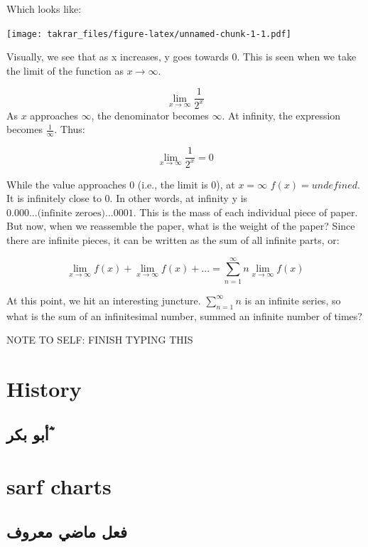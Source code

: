 \documentclass[]{book}
\begin{document}
Which looks like:

\texttt{[image: takrar\_files/figure-latex/unnamed-chunk-1-1.pdf]}

Visually, we see that as x increases, y goes towards 0. This is seen when we take the limit of the function as \(x\to\infty\).

\[
\lim_{x\to\infty} \frac{1}{2^x}
\]
As \(x\) approaches \(\infty\), the denominator becomes \(\infty\). At infinity, the expression becomes \(\frac{1}{\infty}\). Thus:

\[
\lim_{x\to\infty} \frac{1}{2^x} = 0
\label{eq:2}
\]

While the value approaches 0 (i.e., the limit is 0), at \(x=\infty\) \(f(x)=undefined\). It is infinitely close to 0. In other words, at infinity y is \(0.000 ...\text{(infinite zeroes)}...0001\). This is the mass of each individual piece of paper. But now, when we reassemble the paper, what is the weight of the paper? Since there are infinite pieces, it can be written as the sum of all infinite parts, or:

\[
\lim_{x\to\infty} f(x) + \lim_{x\to\infty} f(x) + ... = \sum_{n=1}^{\infty} n\lim_{x\to\infty} f(x)
\label{eq:3}
\]

At this point, we hit an interesting juncture. \(\sum_{n=1}^{\infty}n\) is an infinite series, so what is the sum of an infinitesimal number, summed an infinite number of times?

NOTE TO SELF: FINISH TYPING THIS

\hypertarget{history}{%
\chapter{History}\label{history}}

\hypertarget{ux623ux628ux648-ux628ux643ux631}{%
\section{أبو بكر ؓ}\label{ux623ux628ux648-ux628ux643ux631}}

\hypertarget{refs}{}

\hypertarget{appendix-appendix}{%
\appendix}


\hypertarget{sarf-charts}{%
\chapter{sarf charts}\label{sarf-charts}}

\hypertarget{ux641ux639ux644-ux645ux627ux636ux64a-ux645ux639ux631ux648ux641}{%
\section{فعل ماضي معروف}\label{ux641ux639ux644-ux645ux627ux636ux64a-ux645ux639ux631ux648ux641}}
\end{document}
